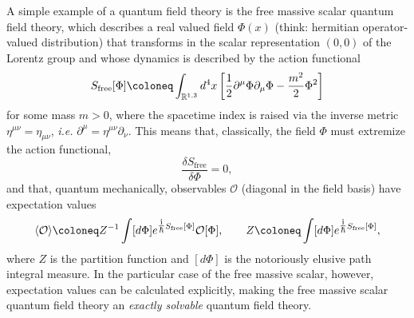 A simple example of a quantum field theory is the free massive scalar quantum field theory, which describes a real valued field $\Phi(x)$ (think: hermitian operator-valued distribution) that transforms in the scalar representation $(0,0)$ of the Lorentz group and whose dynamics is described by the action functional
\begin{equation}
	S_\text{free}[\Phi] \coloneq \int_{\R^{1,3}} d^4 x \left[ \frac{1}{2} \partial^\mu \Phi \partial_\mu \Phi - \frac{m^2}{2} \Phi^2 \right]
\end{equation}
for some mass $m > 0$, where the spacetime index is raised via the inverse metric $\eta^{\mu\nu} = \eta_{\mu\nu}$, \emph{i.e.} $\partial^\mu = \eta^{\mu\nu} \partial_\nu$. This means that, classically, the field $\Phi$ must extremize the action functional,
\begin{equation}
	\frac{\delta S_\text{free}}{\delta \Phi} = 0,
\end{equation}
and that, quantum mechanically, observables $\mathcal{O}$ (diagonal in the field basis) have expectation values
\begin{equation}
	\langle \mathcal{O} \rangle \coloneq Z^{-1} \int [d\Phi] e^{\tfrac{\I}{\hbar} S_\text{free}[\Phi]} \mathcal{O}[\Phi], \qquad Z \coloneq \int [d\Phi] e^{\tfrac{\I}{\hbar} S_\text{free}[\Phi]},
\end{equation}
where $Z$ is the partition function and $[d\Phi]$ is the notoriously elusive path integral measure. In the particular case of the free massive scalar, however, expectation values can be calculated explicitly, making the free massive scalar quantum field theory an \emph{exactly solvable} quantum field theory.

